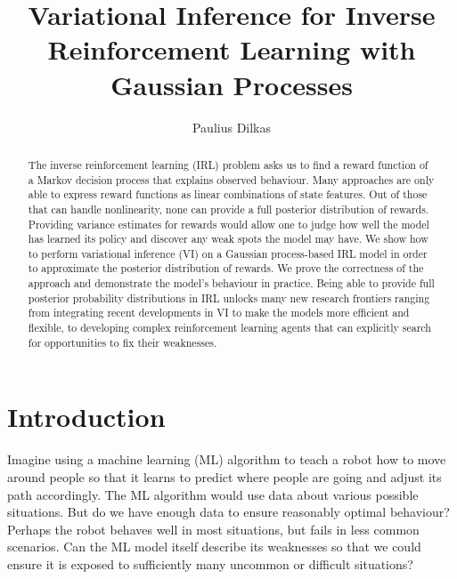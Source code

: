 \documentclass{mpaper}
\begin{document}

\title{Variational Inference for Inverse Reinforcement Learning with Gaussian Processes}
\author{Paulius Dilkas}
\maketitle

\begin{abstract}
  The inverse reinforcement learning (IRL) problem asks us to find a reward
  function of a Markov decision process that explains observed behaviour. Many
  approaches are only able to express reward functions as linear combinations
  of state features. Out of those that can handle nonlinearity, none can provide
  a full posterior distribution of rewards. Providing variance estimates for
  rewards would allow one to judge how well the model has learned its policy and
  discover any weak spots the model may have. We show how to perform variational
  inference (VI) on a Gaussian process-based IRL model in order to approximate
  the posterior distribution of rewards. We prove the correctness of the
  approach and demonstrate the model's behaviour in practice. Being able to
  provide full posterior probability distributions in IRL unlocks many new
  research frontiers ranging from integrating recent developments in VI to make
  the models more efficient and flexible, to developing complex reinforcement
  learning agents that can explicitly search for opportunities to fix their
  weaknesses.
\end{abstract}

\section{Introduction} %

Imagine using a machine learning (ML) algorithm to teach a robot how to move
around people so that it learns to predict where people are going and adjust its
path accordingly. The ML algorithm would use data about various possible
situations. But do we have enough data to ensure reasonably optimal behaviour?
Perhaps the robot behaves well in most situations, but fails in less common
scenarios. Can the ML model itself describe its weaknesses so that we could
ensure it is exposed to sufficiently many uncommon or difficult situations?
\end{document}
